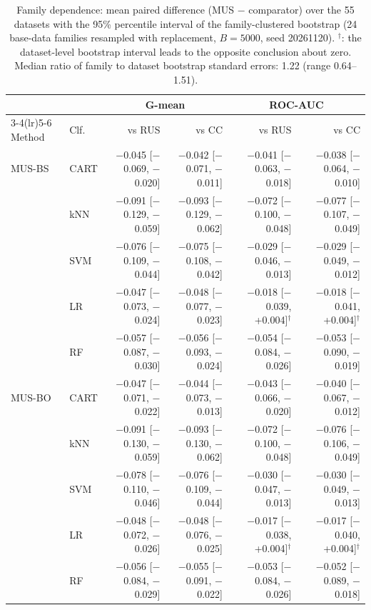 \begin{table}[!htbp]
\centering
\caption{Family dependence: mean paired difference (MUS $-$ comparator) over the 55 datasets with the 95\% percentile interval of the family-clustered bootstrap (24 base-data families resampled with replacement, $B=5000$, seed 20261120). $^{\dagger}$: the dataset-level bootstrap interval leads to the opposite conclusion about zero. Median ratio of family to dataset bootstrap standard errors: 1.22 (range 0.64--1.51).}
\label{tab:a1_family_bootstrap}
\scriptsize
\setlength{\tabcolsep}{3pt}
\begin{tabular}{llrrrr}
\toprule
 & & \multicolumn{2}{c}{G-mean} & \multicolumn{2}{c}{ROC-AUC} \\
\cmidrule(lr){3-4}\cmidrule(lr){5-6}
Method & Clf. & vs RUS & vs CC & vs RUS & vs CC \\
\midrule
MUS-BS & CART & $-$0.045 [$-$0.069, $-$0.020] & $-$0.042 [$-$0.071, $-$0.011] & $-$0.041 [$-$0.063, $-$0.018] & $-$0.038 [$-$0.064, $-$0.010] \\
 & kNN & $-$0.091 [$-$0.129, $-$0.059] & $-$0.093 [$-$0.129, $-$0.062] & $-$0.072 [$-$0.100, $-$0.048] & $-$0.077 [$-$0.107, $-$0.049] \\
 & SVM & $-$0.076 [$-$0.109, $-$0.044] & $-$0.075 [$-$0.108, $-$0.042] & $-$0.029 [$-$0.046, $-$0.013] & $-$0.029 [$-$0.049, $-$0.012] \\
 & LR & $-$0.047 [$-$0.073, $-$0.024] & $-$0.048 [$-$0.077, $-$0.023] & $-$0.018 [$-$0.039, +0.004]$^{\dagger}$ & $-$0.018 [$-$0.041, +0.004]$^{\dagger}$ \\
 & RF & $-$0.057 [$-$0.087, $-$0.030] & $-$0.056 [$-$0.093, $-$0.024] & $-$0.054 [$-$0.084, $-$0.026] & $-$0.053 [$-$0.090, $-$0.019] \\
\midrule
MUS-BO & CART & $-$0.047 [$-$0.071, $-$0.022] & $-$0.044 [$-$0.073, $-$0.013] & $-$0.043 [$-$0.066, $-$0.020] & $-$0.040 [$-$0.067, $-$0.012] \\
 & kNN & $-$0.091 [$-$0.130, $-$0.059] & $-$0.093 [$-$0.130, $-$0.062] & $-$0.072 [$-$0.100, $-$0.048] & $-$0.076 [$-$0.106, $-$0.049] \\
 & SVM & $-$0.078 [$-$0.110, $-$0.046] & $-$0.076 [$-$0.109, $-$0.044] & $-$0.030 [$-$0.047, $-$0.013] & $-$0.030 [$-$0.049, $-$0.013] \\
 & LR & $-$0.048 [$-$0.072, $-$0.026] & $-$0.048 [$-$0.076, $-$0.025] & $-$0.017 [$-$0.038, +0.004]$^{\dagger}$ & $-$0.017 [$-$0.040, +0.004]$^{\dagger}$ \\
 & RF & $-$0.056 [$-$0.084, $-$0.029] & $-$0.055 [$-$0.091, $-$0.022] & $-$0.053 [$-$0.084, $-$0.026] & $-$0.052 [$-$0.089, $-$0.018] \\

\end{tabular}
\end{table}
